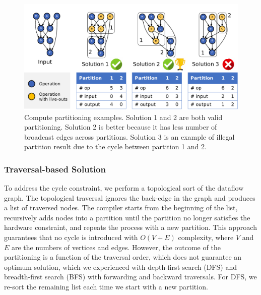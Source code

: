 \begin{figure}
  \centering
  \includegraphics[width=1\columnwidth]{figs/parteg.pdf}
  \caption[Compute partitioning examples]{
    Compute partitioning examples. Solution 1 and 2 are both valid partitioning. Solution 2 is
    better because it has less number of broadcast edges across partitions. Solution 3 is an example
    of illegal partition result due to the cycle between partition 1 and 2.
  }
  \label{fig:parteg}
\end{figure}

\subsubsection{Traversal-based Solution}
To address the cycle constraint, we perform a topological sort of the dataflow graph.
The topological traversal ignores the back-edge in the graph and produces a list of traversed nodes. 
The compiler starts from the beginning of the list, recursively adds nodes into a partition until the partition no longer satisfies the hardware constraint, and repeats the process with a new partition.
This approach guarantees that no cycle is introduced with $O(V+E)$ complexity, where $V$ and $E$ are the numbers of vertices and edges.
However, the outcome of the partitioning is a function of the traversal order, which does not guarantee an optimum solution, which we experienced with depth-first search (DFS) and breadth-first search (BFS) with forwarding and backward traversals.
For DFS, we re-sort the remaining list each time we start with a new partition.


